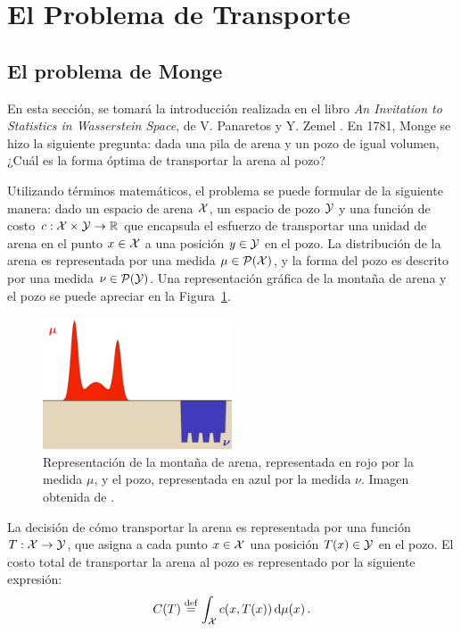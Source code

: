 \section{El Problema de Transporte}
 {



  \subsection*{El problema de Monge}
  {
	  En esta sección, se tomará la introducción realizada en el libro \emph{An Invitation to Statistics in Wasserstein Space}, de V. Panaretos y Y. Zemel \citeyear{panaretos2020invitation}. En 1781, Monge \cite{monge1781memoire} se hizo la siguiente pregunta: dada una pila de arena y un pozo de igual volumen, ¿Cuál es la forma óptima de transportar la arena al pozo?

	  Utilizando términos matemáticos, el problema se puede formular de la siguiente manera: dado un espacio de arena $\cX$, un espacio de pozo $\cY$ y una función de costo $c: \cX \times \cY \to \R$ que encapsula el esfuerzo de transportar una unidad de arena en el punto $x \in \cX$ a una posición $y \in \cY $ en el pozo. La distribución de la arena es representada por una medida $\mu \in \ProbSpace[\cX]$, y la forma del pozo es descrito por una medida $\nu \in \ProbSpace[\cY] $. Una representación gráfica de la montaña de arena y el pozo se puede apreciar en la Figura~\ref{fig:montanas-arena-pozo}.

	  \begin{figure}[ht]
		  \centering
		  \includegraphics[width=0.5\textwidth]{img/transporte/montanas-arena-pozo.png}
		  \caption{Representación de la montaña de arena, representada en rojo por la medida $\mu$, y el pozo, representada en azul por la medida $\nu$. Imagen obtenida de \cite{cuturi2017primer}.}
		  \label{fig:montanas-arena-pozo}
	  \end{figure}

	  La decisión de cómo transportar la arena es representada por una función $T: \cX \to \cY$, que asigna a cada punto $x \in \cX$ una posición $T(x) \in \cY$ en el pozo. El costo total de transportar la arena al pozo es representado por la siguiente expresión:
	  \begin{equation}\label{eq:costoTotalTransporteMonge}
		  C(T) \eqdef \int_{\cX} c(x, T(x)) \dmu[x].
	  \end{equation}

}}

